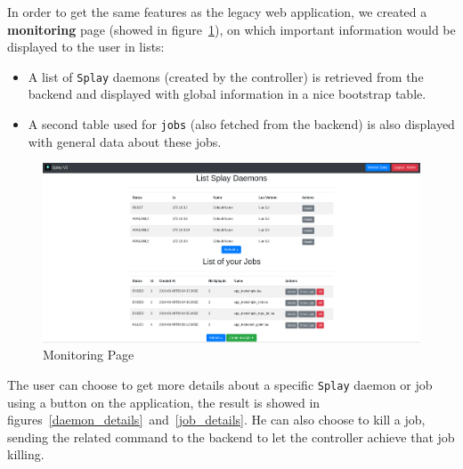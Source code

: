 \documentclass{eplmastersthesis}
\begin{document}
        In order to get the same features as the legacy web application,
        we created a \textbf{monitoring} page (showed in
        figure~\ref{monitor_web}), on which important
        information would be displayed to the user in lists:

        \begin{itemize}
          \item A list of \texttt{Splay} daemons (created by the controller) is retrieved
          from the backend and displayed with global information in a nice
          bootstrap table.
          \item A second table used for \texttt{jobs} (also fetched from the backend) is also
          displayed with general data about these jobs.
        \end{itemize}

        \begin{figure}
          \centering
          \includegraphics[scale=0.27]{figures/monitor.png}
          \caption{\label{monitor_web} Monitoring Page}
        \end{figure}

        The user can choose to
        get more details about a specific \texttt{Splay} daemon or job using a button
        on the application, the result is showed in
        figures~\ref{daemon_details}~and~\ref{job_details}. He can also choose
        to kill a job, sending the related command to the backend to let the
        controller achieve that job killing.
\end{document}
